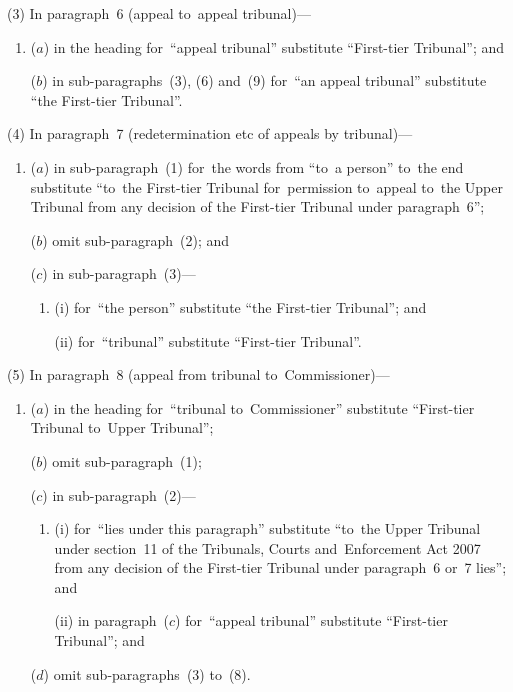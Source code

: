 \documentclass[12pt,a4paper]{article}
\begin{document}
(3) In paragraph~6 (appeal to~appeal tribunal)—
\begin{enumerate}\item[]
($a$) in the heading for~“appeal tribunal” substitute “First-tier Tribunal”; and

($b$) in sub-paragraphs~(3), (6) and~(9) for~“an appeal tribunal” substitute “the First-tier Tribunal”.
\end{enumerate}

(4) In paragraph~7 (redetermination etc of appeals by tribunal)—
\begin{enumerate}\item[]
($a$) in sub-paragraph~(1) for~the words from “to~a person” to~the end substitute “to~the First-tier Tribunal for~permission to~appeal to~the Upper Tribunal from any decision of the First-tier Tribunal under paragraph~6”;

($b$) omit sub-paragraph~(2); and

($c$) in sub-paragraph~(3)—
\begin{enumerate}\item[]
(i) for~“the person” substitute “the First-tier Tribunal”; and

(ii) for~“tribunal” substitute “First-tier Tribunal”.
\end{enumerate}
\end{enumerate}

(5) In paragraph~8 (appeal from tribunal to~Commissioner)—
\begin{enumerate}\item[]
($a$) in the heading for~“tribunal to~Commissioner” substitute “First-tier Tribunal to~Upper Tribunal”;

($b$) omit sub-paragraph~(1);

($c$) in sub-paragraph~(2)—
\begin{enumerate}\item[]
(i) for~“lies under this paragraph” substitute “to~the Upper Tribunal under section~11 of the Tribunals, Courts and~Enforcement Act 2007 from any decision of the First-tier Tribunal under paragraph~6 or~7 lies”; and

(ii) in paragraph~($c$)  for~“appeal tribunal” substitute “First-tier Tribunal”; and
\end{enumerate}

($d$) omit sub-paragraphs~(3) to~(8).
\end{enumerate}
\end{document}
